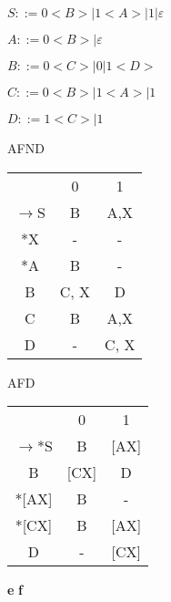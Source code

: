 \documentclass[ ]{article}
\begin{document}
		$S::= 0<B> | 1<A> | 1 | \varepsilon$
		
		$A::= 0<B> | \varepsilon$
		
		$B::= 0<C> | 0 | 1<D>$
		
		$C::= 0<B> | 1<A> | 1$
		
		$D::= 1<C> | 1$
		
		\begin{center}
		AFND\\
		
		\begin{tabular}{ c c c }
  & 0 & 1 \\ 
 $\to$S & B & A,X \\  
 *X & - & - \\
 *A & B & - \\
 B & C, X & D\\
 C& B & A,X\\
 D & - & C, X
		\end{tabular}
		\end{center}
		
		\begin{center}
		AFD\\
		
		\begin{tabular}{ c c c }
   & 0 & 1 \\ 
 $\to$*S & B & [AX] \\  
 B & [CX] & D\\
 *[AX] & B & - \\
 *[CX] & B & [AX]\\
 D & - & [CX]
 		\end{tabular}
		\end{center}
		\textbf{e}
		\textbf{f}
\end{document}
